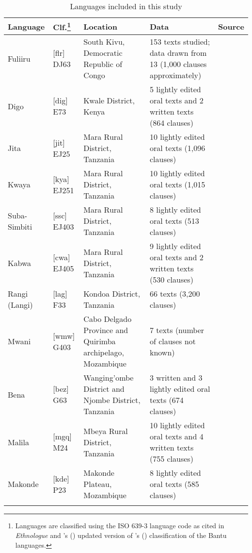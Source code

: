 \documentclass[output=paper]{langsci/langscibook}
\begin{document}
\begin{table}
\small
\begin{tabularx}{\textwidth}{p{1.5cm}p{1cm}QQp{2cm}}
\lsptoprule
Language & Clf.\footnote{Languages are classified using the ISO 639-3 language code as cited in \textit{Ethnologue} \citep{lewisetal2015} and \citeauthor{maho2003}’s (\citeyear{maho2003}) updated version of \citeauthor{guthrie1967}’s (\citeyear{guthrie1967}) classification of the Bantu languages.}
			    & Location & Data & Source\\
\midrule
Fuliiru & [flr] DJ63 & South Kivu, Democratic Republic of Congo & 153 texts studied; data drawn from 13 (1,000 clauses approximately) & \citet{vanotterloo2011,vanotterloo2015}\\
 Digo & [dig] E73 & Kwale District, Kenya & 5 lightly edited oral texts and 2 written texts (864 clauses) & \citet{nicolle2015a}\\
 Jita & [jit] EJ25 & Mara Rural District, Tanzania & 10 lightly edited oral texts (1,096 clauses) & \citet{pylerobinson2015}\\
 Kwaya & [kya] EJ251 & Mara Rural District, Tanzania & 10 lightly edited oral texts (1,015 clauses) & \citet{odom2015}\\
 Suba-Simbiti & [ssc] EJ403 & Mara Rural District, Tanzania & 8 lightly edited oral texts (513 clauses) & \citet{masatu2015}\\
 Kabwa & [cwa] EJ405 & Mara Rural District, Tanzania & 9 lightly edited oral texts and 2 written texts (530 clauses) & \citet{walker2011}\\
 Rangi (Langi) & [lag] F33 & Kondoa District, Tanzania & 66 texts (3,200 clauses) & \citet{Stegen2011}\\
 Mwani & [wmw] G403 & Cabo Delgado Province and Quirimba archipelago, Mozambique & 7 texts (number of clauses not known) & \citet{floor2005}\\
 Bena & [bez] G63 & Wanging’ombe District and Njombe District, Tanzania & 3 written and 3 lightly edited oral texts (674 clauses) & \citet{broomhall2011,eaton2015a}\\
 Malila & [mgq] M24 & Mbeya Rural District, Tanzania & 10 lightly edited oral texts and 4 written texts (755 clauses) & \citet{eaton2015b}\\
 Makonde & [kde] P23 & Makonde Plateau, Mozambique & 8 lightly edited oral texts (585 clauses) & \citet{leach2015}\\

\lspbottomrule
\end{tabularx}

\caption{Languages included in this study}	
\label{tab:1.nicolle}
\end{table}
\end{document}
